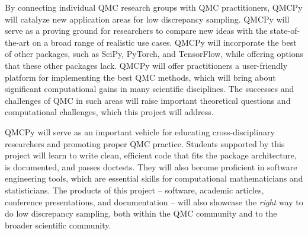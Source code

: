 \documentclass[11pt]{article}%
\begin{document}
\bigskip


\noindent By connecting individual QMC research groups with QMC practitioners, QMCPy will catalyze new application areas for low discrepancy sampling. QMCPy will serve as a proving ground for researchers to compare new ideas with the state-of-the-art on a broad range of realistic use cases. QMCPy will incorporate the best of other packages, such as SciPy, PyTorch, and TensorFlow, while offering options that these other packages lack. QMCPy will offer practitioners a user-friendly platform for implementing the best QMC methods, which will bring about significant computational gains in many scientific disciplines. The successes and challenges of QMC in such areas will raise important theoretical questions and computational challenges, which this project will address.

QMCPy will serve as an important vehicle for educating cross-disciplinary researchers and promoting proper QMC practice. Students supported by this project will learn to write clean, efficient code that fits the package architecture, is documented, and passes doctests. They will also become proficient in software engineering tools, which are essential skills for computational mathematicians and statisticians. The products of this project -- software, academic articles, conference presentations, and documentation -- will also showcase the \textit{right} way to do low discrepancy sampling, both within the QMC community and to the broader scientific community.


 
%
\end{document}
